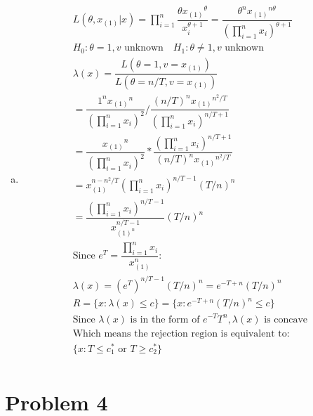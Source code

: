 \documentclass{article}
\newcommand{\prodn}{\prod_{i=1}^{n}}
\newcommand{\ta}{\theta}
\newcommand{\lx}{\lambda(x)}
\begin{document}
\begin{flushleft}
\begin{enumerate}[(a)]
	\item 
\begin{multline*}\\
L(\ta,x_{(1)}|x)=\prodn \dfrac{\ta {x_{(1)}}^\ta}{x_i^{\ta+1}}=\dfrac{\ta^n {x_{(1)}}^{n\ta}}{(\prodn x_i)^{\ta+1}}\\
H_0:\ta=1, v\text{ unknown} \quad H_1:\ta\neq 1, v\text{ unknown}\\
\lx=\dfrac{L(\ta=1,v=x_{(1)})}{L(\ta=n/T,v=x_{(1)})}\\
=\dfrac{1^n {x_{(1)}}^{n}}{(\prodn x_i)^{2}}/\dfrac{(n/T)^n {x_{(1)}}^{n^2/T}}{(\prodn x_i)^{n/T+1}}\\
=\dfrac{{x_{(1)}}^{n}}{(\prodn x_i)^{2}}*\dfrac{(\prodn x_i)^{n/T+1}}{(n/T)^n {x_{(1)}}^{n^2/T}}\\
=x_{(1)}^{n-n^2/T}(\prodn x_i)^{n/T-1}(T/n)^n\\
=\dfrac{(\prodn x_i)^{n/T-1}}{x_{(1)^n}^{n/T-1}}(T/n)^n\\
\text{Since } e^T=\dfrac{\prodn x_i}{x_{(1)}^n}:\\
\lx=(e^{T})^{n/T-1}(T/n)^n=e^{-T+n}(T/n)^n\\
R=\{x:\lx\leq c \}=\{x:e^{-T+n}(T/n)^n\leq c\}\\
\text{Since } \lx \text{ is in the form of } e^{-T}T^n, \lx \text{ is concave}\\
\text{Which means the rejection region is equivalent to:}\\ 
\{x:T\leq c_1^* \text{ or } T\geq c_2^*\}\\
\end{multline*}

	
\end{enumerate}

	\section*{Problem 4}
	
\begin{enumerate}[(a)]
	

\end{enumerate}
\end{flushleft}
\end{document}
